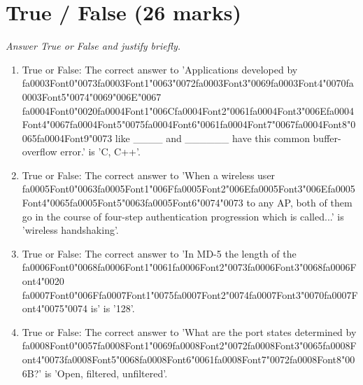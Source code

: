 \documentclass[12pt]{article}
\begin{document}
\section*{True / False (26 marks)}
\textit{Answer True or False and justify briefly.}
\begin{enumerate}[label=\arabic*.]
\item True or False: The correct answer to 'Applications developed by {\csname fa0003Font0\endcsname\char"0073}{\csname fa0003Font1\endcsname\char"0063}{\char"0072}{\csname fa0003Font3\endcsname\char"0069}{\csname fa0003Font4\endcsname\char"0070}{\csname fa0003Font5\endcsname\char"0074}{\char"0069}{\char"006E}{\char"0067} {\csname fa0004Font0\endcsname\char"0020}{\csname fa0004Font1\endcsname\char"006C}{\csname fa0004Font2\endcsname\char"0061}{\csname fa0004Font3\endcsname\char"006E}{\csname fa0004Font4\endcsname\char"0067}{\csname fa0004Font5\endcsname\char"0075}{\csname fa0004Font6\endcsname\char"0061}{\csname fa0004Font7\endcsname\char"0067}{\csname fa0004Font8\endcsname\char"0065}{\csname fa0004Font9\endcsname\char"0073} like \_\_\_\_ and \_\_\_\_\_\_ have this common buffer-overflow error.' is 'C, C++'.
\item True or False: The correct answer to 'When a wireless user {\csname fa0005Font0\endcsname\char"0063}{\csname fa0005Font1\endcsname\char"006F}{\csname fa0005Font2\endcsname\char"006E}{\csname fa0005Font3\endcsname\char"006E}{\csname fa0005Font4\endcsname\char"0065}{\csname fa0005Font5\endcsname\char"0063}{\csname fa0005Font6\endcsname\char"0074}{\char"0073} to any AP, both of them go in the course of four-step authentication progression which is called...' is 'wireless handshaking'.
\item True or False: The correct answer to 'In MD-5 the length of the {\csname fa0006Font0\endcsname\char"0068}{\csname fa0006Font1\endcsname\char"0061}{\csname fa0006Font2\endcsname\char"0073}{\csname fa0006Font3\endcsname\char"0068}{\csname fa0006Font4\endcsname\char"0020} {\csname fa0007Font0\endcsname\char"006F}{\csname fa0007Font1\endcsname\char"0075}{\csname fa0007Font2\endcsname\char"0074}{\csname fa0007Font3\endcsname\char"0070}{\csname fa0007Font4\endcsname\char"0075}{\char"0074} is' is '128'.
\item True or False: The correct answer to 'What are the port states determined by {\csname fa0008Font0\endcsname\char"0057}{\csname fa0008Font1\endcsname\char"0069}{\csname fa0008Font2\endcsname\char"0072}{\csname fa0008Font3\endcsname\char"0065}{\csname fa0008Font4\endcsname\char"0073}{\csname fa0008Font5\endcsname\char"0068}{\csname fa0008Font6\endcsname\char"0061}{\csname fa0008Font7\endcsname\char"0072}{\csname fa0008Font8\endcsname\char"006B}?' is 'Open, filtered, unfiltered'.

\end{enumerate}
\end{document}

